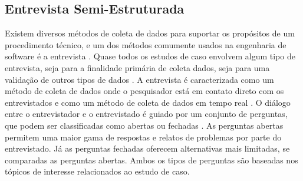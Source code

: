 \subsection{Entrevista Semi-Estruturada}

Existem diversos métodos de coleta de dados para suportar os propósitos de um procedimento técnico, e um dos métodos comumente usados na engenharia de software é a entrevista \cite{caseStudySE}. Quase todos os estudos de caso envolvem algum tipo de entrevista, seja para a finalidade primária de coleta dados, seja para uma validação de outros tipos de dados \cite{caseStudySE}. A entrevista é caracterizada como um método de coleta de dados onde o pesquisador está em contato direto com os entrevistados e como um método de coleta de dados em tempo real \cite{caseStudySE}. O diálogo entre o entrevistador e o entrevistado é guiado por um conjunto de perguntas, que podem ser classificadas como abertas ou fechadas \cite{caseStudySE}. As perguntas abertas permitem uma maior gama de respostas e relatos de problemas por parte do entrevistado. Já as perguntas fechadas oferecem alternativas mais limitadas, se comparadas as perguntas abertas. Ambos os tipos de perguntas são baseadas nos tópicos de interesse relacionados ao estudo de caso.

